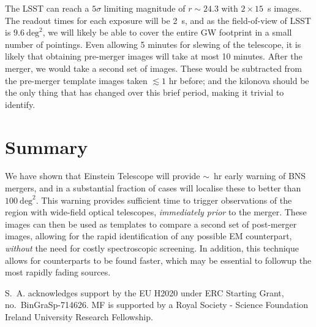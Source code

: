 \documentclass{aa}
\begin{document}
The LSST can reach a $5\sigma$ limiting magnitude of $r\sim24.3$ with $2\times15$~s images. The readout times for each exposure will be 2~s, and as the field-of-view of LSST is $9.6~\mathrm{deg}^2$, we will likely be able to cover the entire GW footprint in a small number of pointings. Even allowing 5 minutes for slewing of the telescope, it is likely that obtaining pre-merger images will take at most 10 minutes.
After the merger, we would take a second set of images. These would be subtracted from the pre-merger template images taken $\lesssim1$ hr before; and the kilonova should be the only thing that has changed over this brief period, making it trivial to identify.

\section{Summary}

We have shown that Einstein Telescope will provide $\sim$~hr early warning of BNS mergers,
and in a substantial fraction of cases will localise these to better than $100~\mathrm{deg}^2$.
This warning provides sufficient time to trigger observations of the region with wide-field
optical telescopes, {\it immediately prior} to the merger. These images can then be used as templates
to compare a second set of post-merger images, allowing for the rapid identification of any possible
EM counterpart, {\it without} the need for costly spectroscopic screening. In addition, this technique allows for 
counterparts to be found faster, which may be essential to followup the most rapidly fading sources.



\begin{acknowledgements}
 S.~A. acknowledges support by the EU H2020 under ERC Starting Grant, no.~BinGraSp-714626.
 MF is supported by a Royal Society - Science Foundation Ireland University Research Fellowship.
\end{acknowledgements}




\end{document}
